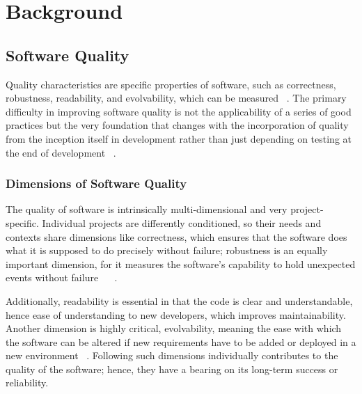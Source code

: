
%

\chapter{Background}
\label{cha:Background}


\section{Software Quality}

Quality characteristics are specific properties of software, such as correctness, robustness, readability, and evolvability, which can be measured ~\cite{MetricsMaintainability1994}. The primary difficulty in improving software quality is not the applicability of a series of good practices but the very foundation that changes with the incorporation of quality from the inception itself in development rather than just depending on testing at the end of development ~\cite{lientz1980software}.

\subsection{Dimensions of Software Quality}

The quality of software is intrinsically multi-dimensional and very project-specific. Individual projects are differently conditioned, so their needs and contexts share dimensions like correctness, which ensures that the software does what it is supposed to do precisely without failure; robustness is an equally important dimension, for it measures the software's capability to hold unexpected events without failure ~\cite{MetricsMaintainability1994} ~\cite{NeriSoftwareQuality2020}.

Additionally, readability is essential in that the code is clear and understandable, hence ease of understanding to new developers, which improves maintainability. Another dimension is highly critical, evolvability, meaning the ease with which the software can be altered if new requirements have to be added or deployed in a new environment ~\cite{NeriSoftwareQuality2020}. Following such dimensions individually contributes to the quality of the software; hence, they have a bearing on its long-term success or reliability.

